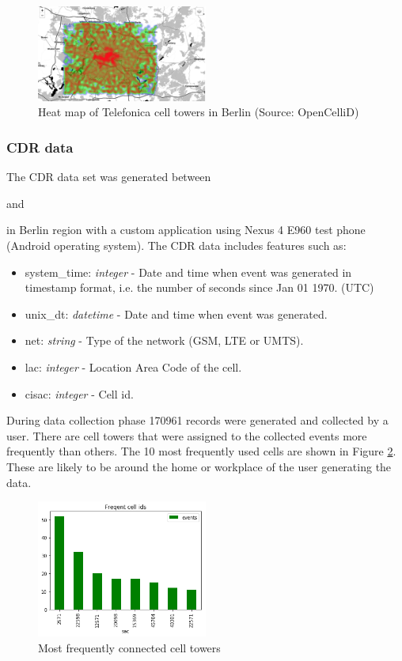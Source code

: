 \begin{figure}[h]
    \includegraphics[width=0.5\textwidth]{images/opencellid.png}
    \caption{Heat map of Telefonica cell towers in Berlin (Source: OpenCelliD) }
    \label{fig:opencellid}
\end{figure}

\subsubsection{CDR data}
The CDR data set was generated between \date{2018/02/26} and \date{2018/03/16} in Berlin region with a custom application using Nexus 4 E960 test phone (Android operating system). The CDR data includes features such as:
\begin{itemize}
\item system\_time: \textit{integer} - Date and time when event was generated in timestamp format, i.e. the number of seconds since Jan 01 1970. (UTC)
\item unix\_dt: \textit{datetime} - Date and time when event was generated.
\item net: \textit{string} - Type of the network (GSM, LTE or UMTS).
\item lac: \textit{integer} - Location Area Code of the cell.
\item cisac: \textit{integer} - Cell id.
\end{itemize}

During data collection phase 170961 records were generated and collected by a user. There are cell towers that were assigned to the collected events more frequently than others. The 10 most frequently used cells are shown in Figure \ref{fig:freq_cells}. These are likely to be around the home or workplace of the user generating the data.

\begin{figure}[h]
    \centering
    \includegraphics[width=0.5\textwidth]{images/frequent_cell_ids.png}
    \caption{Most frequently connected cell towers}
    \label{fig:freq_cells}
\end{figure}

